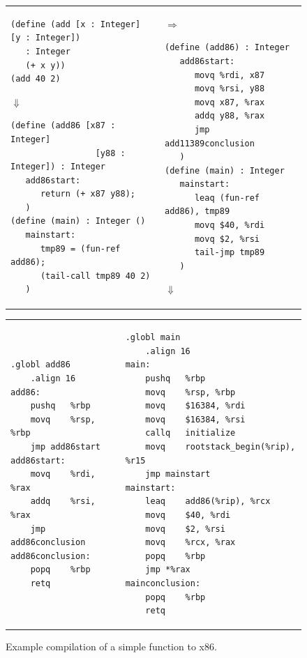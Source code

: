 \documentclass[11pt]{book}
\begin{document}
\begin{figure}[tbp]
\begin{tabular}{ll}
\begin{minipage}{0.5\textwidth}
\begin{lstlisting}[basicstyle=\ttfamily\scriptsize]
(define (add [x : Integer] [y : Integer])
   : Integer
   (+ x y))
(add 40 2)
\end{lstlisting}
$\Downarrow$
\begin{lstlisting}[basicstyle=\ttfamily\scriptsize]
(define (add86 [x87 : Integer]
                 [y88 : Integer]) : Integer
   add86start:
      return (+ x87 y88);
   )
(define (main) : Integer ()
   mainstart:
      tmp89 = (fun-ref add86);
      (tail-call tmp89 40 2)
   )
\end{lstlisting}
\end{minipage}
&
$\Rightarrow$
\begin{minipage}{0.5\textwidth}
\begin{lstlisting}[basicstyle=\ttfamily\scriptsize]
(define (add86) : Integer
   add86start:
      movq %rdi, x87
      movq %rsi, y88
      movq x87, %rax
      addq y88, %rax
      jmp add11389conclusion
   )
(define (main) : Integer
   mainstart:
      leaq (fun-ref add86), tmp89
      movq $40, %rdi
      movq $2, %rsi
      tail-jmp tmp89
   )
\end{lstlisting}
$\Downarrow$
\end{minipage}
\end{tabular}
\begin{tabular}{ll}
\begin{minipage}{0.3\textwidth}
\begin{lstlisting}[basicstyle=\ttfamily\scriptsize]
	.globl add86
	.align 16
add86:
	pushq	%rbp
	movq	%rsp, %rbp
	jmp	add86start
add86start:
	movq	%rdi, %rax
	addq	%rsi, %rax
	jmp add86conclusion
add86conclusion:
	popq	%rbp
	retq
\end{lstlisting}
\end{minipage}
&
\begin{minipage}{0.5\textwidth}
\begin{lstlisting}[basicstyle=\ttfamily\scriptsize]
	.globl main
	.align 16
main:
	pushq	%rbp
	movq	%rsp, %rbp
	movq	$16384, %rdi
	movq	$16384, %rsi
	callq	initialize
	movq	rootstack_begin(%rip), %r15
	jmp	mainstart
mainstart:
	leaq	add86(%rip), %rcx
	movq	$40, %rdi
	movq	$2, %rsi
	movq	%rcx, %rax
	popq	%rbp
	jmp	*%rax
mainconclusion:
	popq	%rbp
	retq
\end{lstlisting}
\end{minipage}
\end{tabular}
\caption{Example compilation of a simple function to x86.}
\label{fig:add-fun}
\end{figure}
\end{document}
